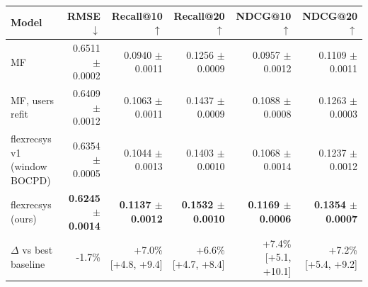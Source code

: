 \begin{tabular}{lrrrrr}
\toprule
Model & RMSE $\downarrow$ & Recall@10 $\uparrow$ & Recall@20 $\uparrow$ & NDCG@10 $\uparrow$ & NDCG@20 $\uparrow$ \\
\midrule
MF & 0.6511 $\pm$ 0.0002 & 0.0940 $\pm$ 0.0011 & 0.1256 $\pm$ 0.0009 & 0.0957 $\pm$ 0.0012 & 0.1109 $\pm$ 0.0011 \\
MF, users refit & 0.6409 $\pm$ 0.0012 & 0.1063 $\pm$ 0.0011 & 0.1437 $\pm$ 0.0009 & 0.1088 $\pm$ 0.0008 & 0.1263 $\pm$ 0.0003 \\
flexrecsys v1 (window BOCPD) & 0.6354 $\pm$ 0.0005 & 0.1044 $\pm$ 0.0013 & 0.1403 $\pm$ 0.0010 & 0.1068 $\pm$ 0.0014 & 0.1237 $\pm$ 0.0012 \\
flexrecsys (ours) & \textbf{0.6245 $\pm$ 0.0014} & \textbf{0.1137 $\pm$ 0.0012} & \textbf{0.1532 $\pm$ 0.0010} & \textbf{0.1169 $\pm$ 0.0006} & \textbf{0.1354 $\pm$ 0.0007} \\
\midrule
$\Delta$ vs best baseline & -1.7\% & +7.0\% [+4.8, +9.4] & +6.6\% [+4.7, +8.4] & +7.4\% [+5.1, +10.1] & +7.2\% [+5.4, +9.2] \\
\bottomrule
\end{tabular}
